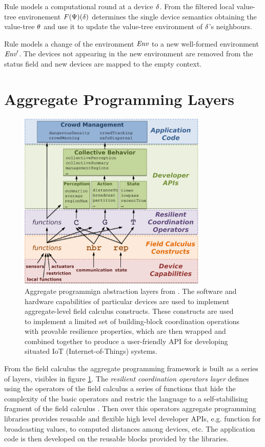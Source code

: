 Rule  models a computational round at a device $\delta$. From the filtered local value-tree environement $F(\Psi)(\delta)$ determines the single device semantics obtaining the value-tree $\theta$ and use it to update the value-tree environment of $\delta$'s neighbours.

Rule  models a change of the environment $\textit{Env}$ to a new well-formed environment $\textit{Env}'$. The devices not appearing in the new environment are removed from the status field and new devices are mapped to the empty context.


\section{Aggregate Programming Layers}

\begin{figure}
\centering
\includegraphics[width=0.8\textwidth]{imgs/layers.pdf}	
\caption{Aggregate programmign abstraction layers from \cite{Aggregate01}. The software and hardware capabilities of particular devices are used to implement aggregate-level field calculus constructs. These constructs are used to implement a limited set of building-block coordination operations with provable resilience properties, which are then wrapped and combined together to produce a user-friendly API for developing situated IoT (Internet-of-Things) systems.}
\label{fig:aglayers}
\end{figure}

From the field calculus the aggregate programming framework is built as a series of layers, visibles in figure \ref{fig:aglayers}. The \textit{resilient coordination operators layer} defines using the operators of the field calculus a series of functions that hide the complexity of the basic operators and restric the language to a self-stabilising fragment  of the field calculus \cite{SelfStabilizing}. Then over this operators aggregate programming libraries provides reusable and flexible high level developer APIs, e.g. function for broadcasting values, to computed distances among devices, etc. The application code is then developed on the reusable blocks provided by the libraries.

